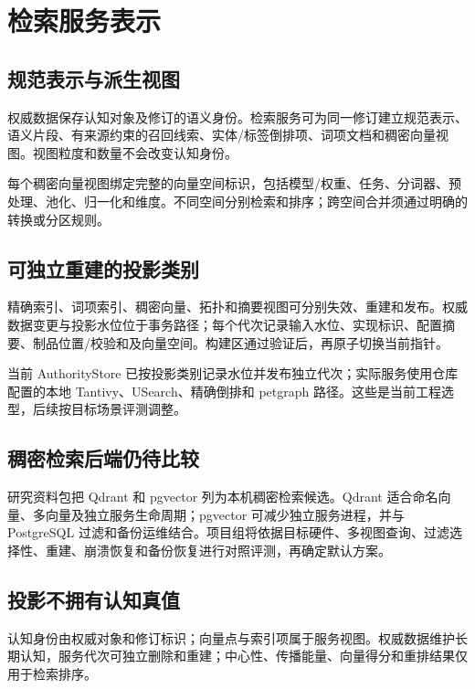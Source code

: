 \chapter{检索服务表示}

\section{规范表示与派生视图}

权威数据保存认知对象及修订的语义身份。检索服务可为同一修订建立规范表示、语义片段、有来源约束的召回线索、实体/标签倒排项、词项文档和稠密向量视图。视图粒度和数量不会改变认知身份。\cite{nous-research-package}

每个稠密向量视图绑定完整的向量空间标识，包括模型/权重、任务、分词器、预处理、池化、归一化和维度。不同空间分别检索和排序；跨空间合并须通过明确的转换或分区规则。

\section{可独立重建的投影类别}

精确索引、词项索引、稠密向量、拓扑和摘要视图可分别失效、重建和发布。权威数据变更与投影水位位于事务路径；每个代次记录输入水位、实现标识、配置摘要、制品位置/校验和及向量空间。构建区通过验证后，再原子切换当前指针。\cite{nous-research-package}

当前 AuthorityStore 已按投影类别记录水位并发布独立代次；实际服务使用仓库配置的本地 Tantivy、USearch、精确倒排和 petgraph 路径。这些是当前工程选型，后续按目标场景评测调整。\cite{nous-code-snapshot}

\section{稠密检索后端仍待比较}

研究资料包把 Qdrant 和 pgvector 列为本机稠密检索候选。Qdrant 适合命名向量、多向量及独立服务生命周期；pgvector 可减少独立服务进程，并与 PostgreSQL 过滤和备份运维结合。项目组将依据目标硬件、多视图查询、过滤选择性、重建、崩溃恢复和备份恢复进行对照评测，再确定默认方案。\cite{nous-research-package}

\section{投影不拥有认知真值}

认知身份由权威对象和修订标识；向量点与索引项属于服务视图。权威数据维护长期认知，服务代次可独立删除和重建；中心性、传播能量、向量得分和重排结果仅用于检索排序。
